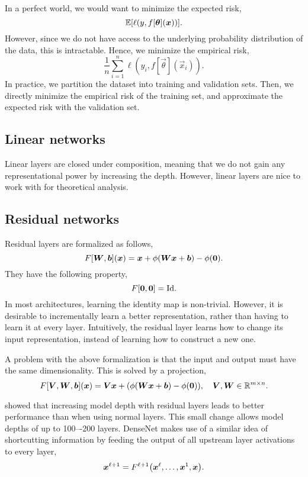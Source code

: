In a perfect world, we would want to minimize the expected risk, \[
    \mathbb{E}[\ell(y, f[\bm{\theta}](\bm{x}))].
\]
However, since we do not have access to the underlying probability distribution of the data, this
is intractable. Hence, we minimize the empirical risk, \[
    \frac{1}{n} \sum_{i=1}^{n} \ell(y_i, f[\vec{\theta}](\vec{x}_i)).
\]
In practice, we partition the dataset into training and validation sets. Then, we directly minimize
the empirical risk of the training set, and approximate the expected risk with the validation set.

\subsection{Linear networks}

Linear layers are closed under composition, meaning that we do not gain any representational power
by increasing the depth. However, linear layers are nice to work with for theoretical analysis.

\subsection{Residual networks}

Residual layers are formalized as follows, \[
    F[\bm{W}, \bm{b}](\bm{x}) = \bm{x} + \phi(\bm{W} \bm{x} + \bm{b}) - \phi(\bm{0}).
\]
They have the following property, \[
    F[\bm{0}, \bm{0}] = \mathrm{Id}.
\]
In most architectures, learning the identity map is non-trivial. However, it is desirable to
incrementally learn a better representation, rather than having to learn it at every layer.
Intuitively, the residual layer learns how to change its input representation, instead of learning
how to construct a new one.

A problem with the above formalization is that the input and output must have the same
dimensionality. This is solved by a projection, \[
    F[\bm{V}, \bm{W}, \bm{b}](\bm{x}) = \bm{V} \bm{x} + (\phi(\bm{W} \bm{x} + \bm{b}) - \phi(\bm{0})), \quad \bm{V}, \bm{W} \in \mathbb{R}^{m\times n}.
\]

\citet{he2016deep} showed that increasing model depth with residual layers leads to better
performance than when using normal layers. This small change allows model depths of up to 100–-200
layers. DenseNet \citep{zhu2017densenet} makes use of a similar idea of shortcutting information by
feeding the output of all upstream layer activations to every layer, \[
    \vec{x}^{\ell+1} = F^{\ell+1}\lft( \vec{x}^\ell, \ldots, \vec{x}^1, \vec{x} \rgt).
\]

